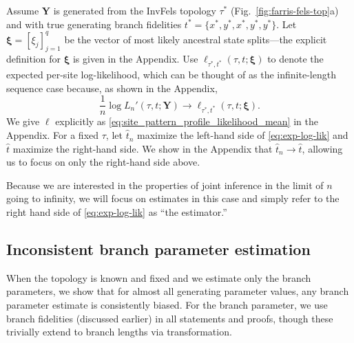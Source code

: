 \documentclass[11pt]{article}
\newcommand{\fullAlignment}{\mathbf{Y}}
\newcommand{\nCols}{n}
\newcommand{\nSiteSplits}{q}
\begin{document}
Assume $\fullAlignment$ is generated from the InvFels topology $\tau^*$ (Fig.~\ref{fig:farris-fels-top}a) and with true generating branch fidelities $t^*=\{x^*, y^*, x^*, y^*, y^*\}$.
Let $\boldsymbol\xi = [\xi_j]_{j=1}^\nSiteSplits$ be the vector of most likely ancestral state splits---the explicit definition for $\boldsymbol\xi$ is given in the Appendix.
Use $\ell_{\tau^*,t^*}(\tau, t; \boldsymbol\xi)$ to denote the expected per-site log-likelihood, which can be thought of as the infinite-length sequence case because, as shown in the Appendix,
\begin{equation}
\label{eq:exp-log-lik}
\frac{1}{n}\log L_\nCols'(\tau, t; \fullAlignment) \rightarrow \ell_{\tau^*,t^*}(\tau, t; \boldsymbol\xi).
\end{equation}
We give $\ell$ explicitly as \eqref{eq:site_pattern_profile_likelihood_mean} in the Appendix.
For a fixed $\tau$, let $\hat{t}_\nCols$ maximize the left-hand side of \eqref{eq:exp-log-lik} and $\hat{t}$ maximize the right-hand side.
We show in the Appendix that $\hat{t}_\nCols \rightarrow \hat{t}$, allowing us to focus on only the right-hand side above.

Because we are interested in the properties of joint inference in the limit of $n$ going to infinity, we will focus on estimates in this case and simply refer to the right hand side of \eqref{eq:exp-log-lik} as ``the estimator.''


\subsection*{Inconsistent branch parameter estimation}
When the topology is known and fixed and we estimate only the branch parameters, we show that for almost all generating parameter values, any branch parameter estimate is consistently biased.
For the branch parameter, we use branch fidelities (discussed earlier) in all statements and proofs, though these trivially extend to branch lengths via transformation.
\end{document}
